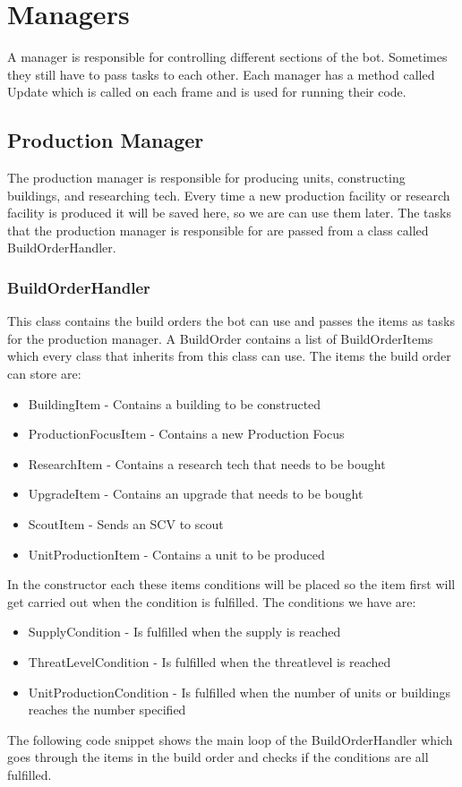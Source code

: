 
\section{Managers}
	A manager is responsible for controlling different sections of the bot. Sometimes they still have to pass tasks to each other. Each manager has 
	a method called Update which is called on each frame and is used for running their code.
	\subsection{Production Manager}
		The production manager is responsible for producing units, constructing buildings, and researching tech. Every time a new production facility or 
		 research facility is produced it will be saved here, so we are can use them later. 
		The tasks that the production manager is responsible for are passed from a 
		class called BuildOrderHandler.
		\subsubsection*{BuildOrderHandler}
			This class contains the build orders the bot can use and passes the items as tasks for the production manager. A BuildOrder contains a list of 
			BuildOrderItems which every class that inherits from this class can use. The items the build order can store are:
			\begin{itemize}
				\item BuildingItem - Contains a building to be constructed
				\item ProductionFocusItem - Contains a new Production Focus
				\item ResearchItem - Contains a research tech that needs to be bought
				\item UpgradeItem - Contains an upgrade that needs to be bought
				\item ScoutItem - Sends an SCV to scout
				\item UnitProductionItem - Contains a unit to be produced
			\end{itemize}
			In the constructor each these items conditions will be placed so the item first will get carried out when the condition is fulfilled.
			The conditions we have are: 
			\begin{itemize}
				\item SupplyCondition - Is fulfilled when the supply is reached
				\item ThreatLevelCondition - Is fulfilled when the threatlevel is reached
				\item UnitProductionCondition - Is fulfilled when the number of units or buildings reaches the number specified
			\end{itemize}
			The following code snippet shows the main loop of the BuildOrderHandler which goes through the items in the build order and checks if the 
			conditions are all fulfilled.
			
